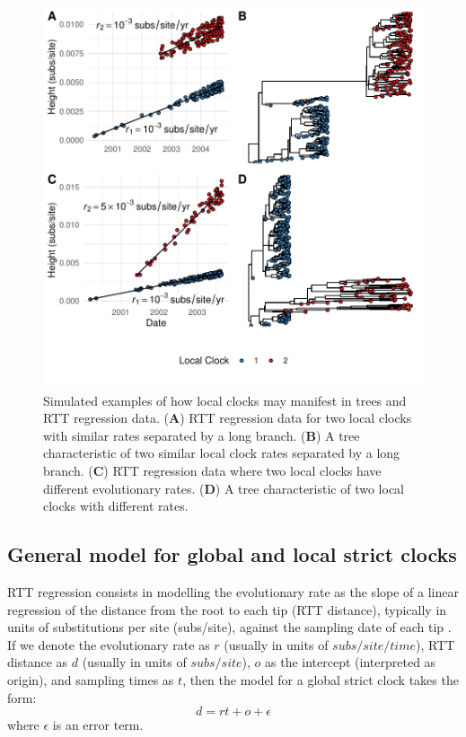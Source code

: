\documentclass{article}
\begin{document}
\begin{figure}[H]
\centering
\includegraphics[width = 0.75\linewidth]{egRTT}
\caption{Simulated examples of how local clocks may manifest in trees and RTT regression data. (\textbf{A}) RTT regression data for two local clocks with similar rates separated by a long branch. (\textbf{B})
A tree characteristic of two similar local clock rates separated by a long branch. (\textbf{C}) RTT regression data where two local clocks have different evolutionary rates. (\textbf{D}) A tree characteristic of two local clocks with different rates.}
\label{fig:egRTT}
\end{figure}

\subsection*{General model for global and local strict clocks}
RTT regression consists in modelling the evolutionary rate as the slope of a linear regression of the distance from the root to each tip (RTT distance), typically in units of substitutions per site (subs/site), against the sampling date of each tip \citep{drummond_inference_2003}. If we denote the evolutionary rate as $r$ (usually in units of $subs/site/time$), RTT distance as $d$ (usually in units of $subs/site$), $o$ as the intercept (interpreted as origin), and sampling times as $t$, then the model for a global strict clock takes the form:
\begin{equation*}
    d = rt + o + \epsilon
\end{equation*}
where $\epsilon$ is an error term.
\end{document}
